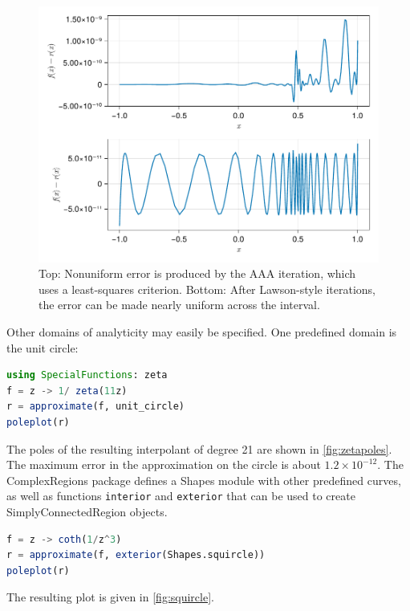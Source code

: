 \documentclass{juliacon}
\begin{document}
\begin{figure}
\centering
\includegraphics[width=\columnwidth]{minimax.pdf}
\caption{Top: Nonuniform error is produced by the AAA iteration, which uses a least-squares criterion. Bottom: After Lawson-style iterations, the error can be made nearly uniform across the interval.}
\label{fig:minimax}
\end{figure}

Other domains of analyticity may easily be specified. One predefined domain is the unit circle: 
\begin{lstlisting}[language = Julia, caption={Approximation on the unit circle.}]
using SpecialFunctions: zeta
f = z -> 1/ zeta(11z)
r = approximate(f, unit_circle)
poleplot(r)
\end{lstlisting}
The poles of the resulting interpolant of degree 21 are shown in \autoref{fig:zetapoles}. The maximum error in the approximation on the circle is about $1.2\times 10^{-12}$. The \textsf{ComplexRegions} package defines a \textsf{Shapes} module with other predefined curves, as well as functions \verb|interior| and \verb|exterior| that can be used to create \textsf{SimplyConnectedRegion} objects.
\begin{lstlisting}[language = Julia, caption={Approximation on an exterior domain.}]
f = z -> coth(1/z^3)
r = approximate(f, exterior(Shapes.squircle))
poleplot(r)
\end{lstlisting}
The resulting plot is given in \autoref{fig:squircle}.
\end{document}
